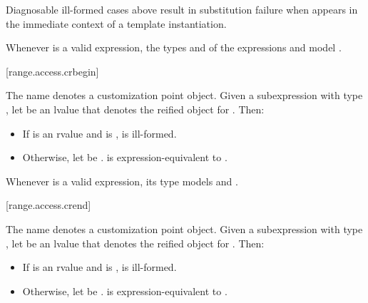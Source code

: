 \pnum
\begin{note}
Diagnosable ill-formed cases above
result in substitution failure when 
appears in the immediate context of a template instantiation.
\end{note}

\pnum
\begin{note}
Whenever  is a valid expression,
the types  and  of the expressions
 and 
model .
\end{note}

[range.access.crbegin]{}
%

\pnum
The name  denotes a customization point
object.
Given a subexpression  with type ,
let  be an lvalue that denotes the reified object for .
Then:
\begin{itemize}
\item
If  is an rvalue and
 is ,
 is ill-formed.
\item
Otherwise,
let  be .
 is expres\-sion-equivalent to
.
\end{itemize}

\pnum
\begin{note}
Whenever  is a valid expression, its
type models  and
.
\end{note}

[range.access.crend]{}
%

\pnum
The name  denotes a customization point
object.
Given a subexpression  with type ,
let  be an lvalue that denotes the reified object for .
Then:
\begin{itemize}
\item
If  is an rvalue and
 is ,
 is ill-formed.
\item
Otherwise,
let  be .
 is expression-equivalent to
.
\end{itemize}


